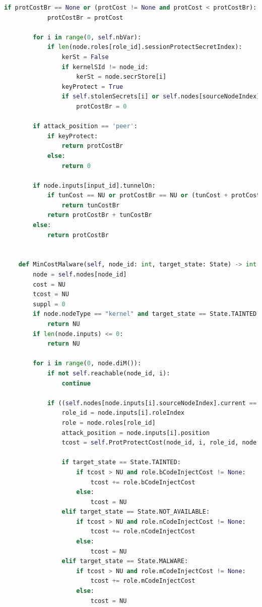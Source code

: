 \documentclass[a4paper]{article}
\begin{document}
\begin{appendices}
\begin{lstlisting}[language=python]
        if protCostBr == None or (protCost != None and protCost < protCostBr):
            protCostBr = protCost

        for i in range(0, self.nbVar):
            if len(node.roles[role_id].sessionProtectSecretIndex):
                kerSt = False
                if kernelSId != node_id:
                    kerSt = node.secrStore[i]
                keyProtect = True
                if self.stolenSecrets[i] or self.nodes[sourceNodeIndex].secrStore[i] or kerSt:
                    protCostBr = 0

        if attack_position == 'peer':
            if keyProtect:
                return protCostBr
            else:
                return 0

        if node.inputs[input_id].tunnelOn:
            if tunCost == NU or protCostBr == NU or (tunCost + protCost > tunCostBr):
                return tunCostBr
            return protCostBr + tunCostBr
        else:
            return protCostBr


    def MinCostMalware(self, node_id: int, target_state: State) -> int:
        node = self.nodes[node_id]
        cost = NU
        tcost = NU
        suppl = 0
        if node.nodeType == "kernel" and target_state == State.TAINTED:
            return NU
        if len(node.inputs) <= 0:
            return NU

        for i in range(0, node.diM()):
            if not self.reachable(node_id, i):
                continue
            
            if ((self.nodes[node.inputs[i].sourceNodeIndex].current == State.MALWARE) or (self.nodes[node.inputs[i].sourceNodeIndex].current == State.TAINTED and node.inputs[i].position == 'peer')):
                role_id = node.inputs[i].roleIndex
                role = node.roles[role_id]
                attack_position = node.inputs[i].position
                tcost = self.ProtProtectCost(node_id, i, role_id, node.inputs[i].sourceNodeIndex,attack_position)

                if target_state == State.TAINTED:
                    if tcost > NU and role.bCodeInjectCost != None:
                        tcost += role.bCodeInjectCost
                    else:
                        tcost = NU
                elif target_state == State.NOT_AVAILABLE:
                    if tcost > NU and role.nCodeInjectCost != None:
                        tcost += role.nCodeInjectCost
                    else:
                        tcost = NU
                elif target_state == State.MALWARE:
                    if tcost > NU and role.mCodeInjectCost != None:
                        tcost += role.mCodeInjectCost
                    else:
                        tcost = NU


\end{lstlisting}
\end{appendices}
\end{document}
